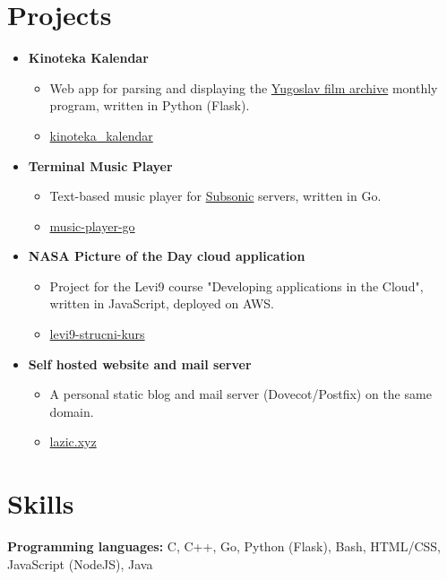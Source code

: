 \documentclass[11pt,a4paper,roman]{moderncv}        %
\begin{document}
\section{Projects}
\begin{itemize}[topsep=0em, itemsep=0pt, itemindent=-1em,font=\huge]
	\item[] \textbf{Kinoteka Kalendar}
		\begin{itemize}[noitemsep,itemindent=-1.25em,topsep=0pt]
			\item[] Web app for parsing and displaying the \href{http://kinoteka.org.rs}{Yugoslav film archive} monthly program, written in Python (Flask).
			\item[] \faGithub \href{https://github.com/vojislav/kinoteka\_kalendar}{ kinoteka\_kalendar}
	 	\end{itemize}
	\item[] \textbf{Terminal Music Player}
		\begin{itemize}[noitemsep,itemindent=-1.25em,topsep=0pt]
			\item[] Text-based music player for \href{http://www.subsonic.org}{Subsonic} servers, written in Go.
			\item[] \faGithub \href{https://github.com/vojislav/music-player-go}{ music-player-go}
	 	\end{itemize}
	 	
	 \item[] \textbf{NASA Picture of the Day cloud application}
	 	\begin{itemize}[noitemsep,itemindent=-1.25em,topsep=0pt]
	 		\item[] Project for the Levi9 course "Developing applications in the Cloud", written in JavaScript, deployed on AWS.
	 		\item[] \faGithub \href{https://github.com/vojislav/levi9-strucni-kurs}{ levi9-strucni-kurs}
	 	\end{itemize}

	\item[] \textbf{Self hosted website and mail server}
		\begin{itemize}[noitemsep,itemindent=-1.25em,topsep=0pt]
			\item[] A personal static blog and mail server (Dovecot/Postfix) on the same domain.
			\item[] \faGlobe \href{https://lazic.xyz}{ lazic.xyz}
	 	\end{itemize}
\end{itemize}

\section{Skills}
\textbf{Programming languages: } C, C++, Go, Python (Flask), Bash, HTML/CSS, JavaScript (NodeJS), Java
\end{document}

